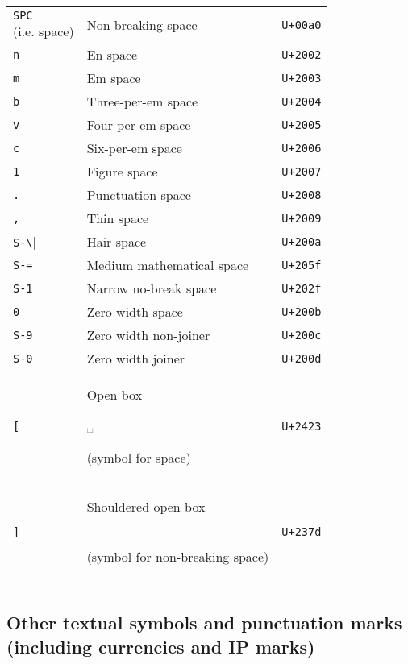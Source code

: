 \documentclass[oneside]{memoir}
\newcommand{\key}{\verb}
\newcommand{\keynv}{\texttt}
\newcommand{\out}[1]{\colorbox{gray!20}{\strut{}#1}}
\newcommand{\uni}[1]{\texttt{#1}}
\begin{document}
\begin{table}
\begin{minipage}{0.5\paperwidth}
\begin{tabular}{lll}
\makecell{\keynv{SPC}\\(i.e. space)}
                       & Non-breaking space                  & \uni{U+00a0} \\
\key|n|                & En space                            & \uni{U+2002} \\
\key|m|                & Em space                            & \uni{U+2003} \\
\key|b|                & Three-per-em space                  & \uni{U+2004} \\
\key|v|                & Four-per-em space                   & \uni{U+2005} \\
\key|c|                & Six-per-em space                    & \uni{U+2006} \\
\key|1|                & Figure space                        & \uni{U+2007} \\
\key|.|                & Punctuation space                   & \uni{U+2008} \\
\key|,|                & Thin space                          & \uni{U+2009} \\
\key|S-\|              & Hair space                          & \uni{U+200a} \\
\key|S-=|              & Medium mathematical space           & \uni{U+205f} \\
\key|S-1|              & Narrow no-break space               & \uni{U+202f} \\
\key|0|                & Zero width space                    & \uni{U+200b} \\
\key|S-9|              & Zero width non-joiner               & \uni{U+200c} \\
\key|S-0|              & Zero width joiner                   & \uni{U+200d} \\
\key|[|                & Open box \out{␣} (symbol for space) & \uni{U+2423} \\
\key|]|
  & \makecell{Shouldered open box \out{\tfbs{⍽}}\\\quad(symbol for non-breaking space)}
  & \uni{U+237d} \\
\bottomrule&&
\end{tabular}
\end{minipage}
\end{table}

\subsection{Other textual symbols and punctuation marks (including currencies and IP marks)}
\label{sec:symbols_punctuation}
\end{document}
